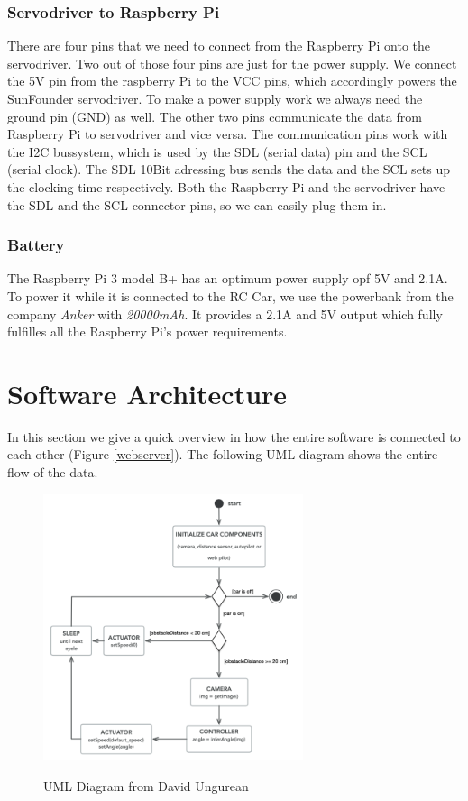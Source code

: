 \documentclass[journal]{IEEEtran}
\begin{document}
\subsubsection{Servodriver to Raspberry Pi}
There are four pins that we need to connect from the Raspberry Pi onto the servodriver. Two out of those four pins are just for the power supply. We connect the 5V pin from the raspberry Pi to the VCC pins, which accordingly powers the SunFounder servodriver. To make a power supply work we always need the ground pin (GND) as well. The other two pins communicate the data from Raspberry Pi to servodriver and vice versa. The communication pins work with the I2C bussystem, which is used by the SDL (serial data) pin and the SCL (serial clock). The SDL 10Bit adressing bus sends the data and the SCL sets up the clocking time respectively. Both the Raspberry Pi and the servodriver have the SDL and the SCL connector pins, so we can easily plug them in. \\

\subsubsection{Battery}
The Raspberry Pi 3 model B+ has an optimum power supply opf 5V and 2.1A. To power it while it is connected to the RC Car, we use the powerbank from the company \textit{Anker} with \textit{20000mAh}. It provides a 2.1A and 5V output which fully fulfilles all the Raspberry Pi's power requirements.

\section{Software Architecture}

In this section we give a quick overview in how the entire software is connected to each other (Figure \ref{webserver}). The following UML diagram shows the entire flow of the data.

\begin{figure}
  \begin{center}
  \includegraphics[width=3in]{photo/uml}\\
  \caption{UML Diagram from David Ungurean \cite{master}}\label{uml}
  \end{center}
\end{figure}
\end{document}
